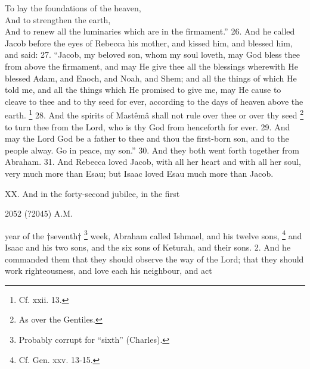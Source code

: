 To lay the foundations of the heaven,\\
And to strengthen the earth,\\
And to renew all the luminaries which are in the firmament.'' 26. And he called Jacob before the eyes of Rebecca his mother, and kissed him, and blessed him, and said: 27. ``Jacob, my beloved son, whom my soul loveth, may God bless thee from above the firmament, and may He give thee all the blessings wherewith He blessed Adam, and Enoch, and Noah, and Shem; and all the things of which He told me, and all the things which He promised to give me, may He cause to cleave to thee and to thy seed for ever, according to the days of heaven above the earth. \footnote{Cf. xxii. 13.} 28. And the spirits of Mastêmâ shall not rule over thee or over thy seed \footnote{As over the Gentiles.} to turn thee from the Lord, who is thy God from henceforth for ever. 29. And may the Lord God be a father to thee and thou the first-born son, and to the people alway. Go in peace, my son.'' 30. And they both went forth together from Abraham. 31. And Rebecca loved Jacob, with all her heart and with all her soul, very much more than Esau; but Isaac loved Esau much more than Jacob.


XX. And in the forty-second jubilee, in the first

2052 (?2045) A.M.

year of the †seventh† \footnote{Probably corrupt for ``sixth'' (Charles).} week, Abraham called Ishmael, and his twelve sons, \footnote{Cf. Gen. xxv. 13-15.} and Isaac and his two sons, and the six sons of Keturah, and their sons. 2. And he commanded them that they should observe the way of the Lord; that they should work righteousness, and love each his neighbour, and act

